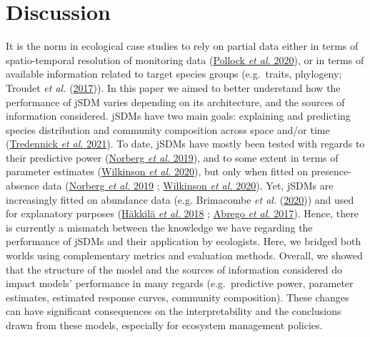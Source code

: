 \documentclass[9pt,biorxiv,doublespacing,lineno,endfloat]{lapreprint}
\begin{document}
\hypertarget{discussion}{%
\section{Discussion}\label{discussion}}

It is the norm in ecological case studies to rely on partial data either
in terms of spatio-temporal resolution of monitoring data
(\protect\hyperlink{ref-Pollock_2020}{Pollock \emph{et al.} 2020}), or
in terms of available information related to target species groups
(e.g.~traits, phylogeny; Troudet \emph{et al.}
(\protect\hyperlink{ref-Troudet_2017}{2017})). In this paper we aimed to
better understand how the performance of jSDM varies depending on its
architecture, and the sources of information considered. jSDMs have two
main goals: explaining and predicting species distribution and community
composition across space and/or time
(\protect\hyperlink{ref-Tredennick_2021}{Tredennick \emph{et al.}
2021}). To date, jSDMs have mostly been tested with regards to their
predictive power (\protect\hyperlink{ref-Norberg_2019}{Norberg \emph{et
al.} 2019}), and to some extent in terms of parameter estimates
(\protect\hyperlink{ref-Wilkinson_2020}{Wilkinson \emph{et al.} 2020}),
but only when fitted on presence-absence data
(\protect\hyperlink{ref-Norberg_2019}{Norberg \emph{et al.} 2019} ;
\protect\hyperlink{ref-Wilkinson_2020}{Wilkinson \emph{et al.} 2020}).
Yet, jSDMs are increasingly fitted on abundance data (e.g. Brimacombe
\emph{et al.} (\protect\hyperlink{ref-Brimacombe_2020}{2020})) and used
for explanatory purposes (\protect\hyperlink{ref-Hakkila_2018}{Häkkilä
\emph{et al.} 2018} ; \protect\hyperlink{ref-Abrego_2016}{Abrego
\emph{et al.} 2017}). Hence, there is currently a mismatch between the
knowledge we have regarding the performance of jSDMs and their
application by ecologists. Here, we bridged both worlds using
complementary metrics and evaluation methods. Overall, we showed that
the structure of the model and the sources of information considered do
impact models' performance in many regards (e.g.~predictive power,
parameter estimates, estimated response curves, community composition).
These changes can have significant consequences on the interpretability
and the conclusions drawn from these models, especially for ecosystem
management policies.
\end{document}
